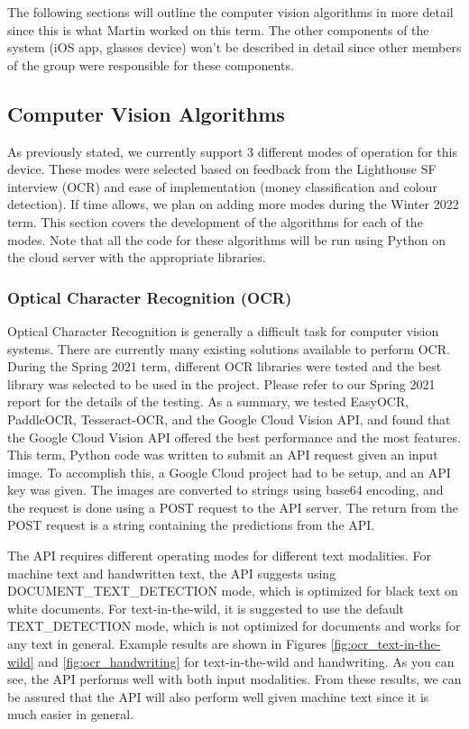 \documentclass[a4paper,11pt]{article}
\begin{document}
The following sections will outline the computer vision algorithms in more detail since this is what Martin worked on this term. The other components of the system (iOS app, glasses device) won't be described in detail since other members of the group were responsible for these components.

\subsection{Computer Vision Algorithms}
\label{cv-algorithms}

As previously stated, we currently support 3 different modes of operation for this device. These modes were selected based on feedback from the Lighthouse SF interview (OCR) and ease of implementation (money classification and colour detection). If time allows, we plan on adding more modes during the Winter 2022 term. This section covers the development of the algorithms for each of the modes. Note that all the code for these algorithms will be run using Python on the cloud server with the appropriate libraries.

\subsubsection{Optical Character Recognition (OCR)}
Optical Character Recognition is generally a difficult task for computer vision systems. There are currently many existing solutions available to perform OCR. During the Spring 2021 term, different OCR libraries were tested and the best library was selected to be used in the project. Please refer to our Spring 2021 report for the details of the testing. As a summary, we tested EasyOCR, PaddleOCR, Tesseract-OCR, and the Google Cloud Vision API, and found that the Google Cloud Vision API offered the best performance and the most features. This term, Python code was written to submit an API request given an input image. To accomplish this, a Google Cloud project had to be setup, and an API key was given. The images are converted to strings using base64 encoding, and the request is done using a POST request to the API server. The return from the POST request is a string containing the predictions from the API.

The API requires different operating modes for different text modalities. For machine text and handwritten text, the API suggests using DOCUMENT\_TEXT\_DETECTION mode, which is optimized for black text on white documents. For text-in-the-wild, it is suggested to use the default TEXT\_DETECTION mode, which is not optimized for documents and works for any text in general. Example results are shown in Figures \ref{fig:ocr_text-in-the-wild} and \ref{fig:ocr_handwriting} for text-in-the-wild and handwriting. As you can see, the API performs well with both input modalities. From these results, we can be assured that the API will also perform well given machine text since it is much easier in general.
\end{document}
